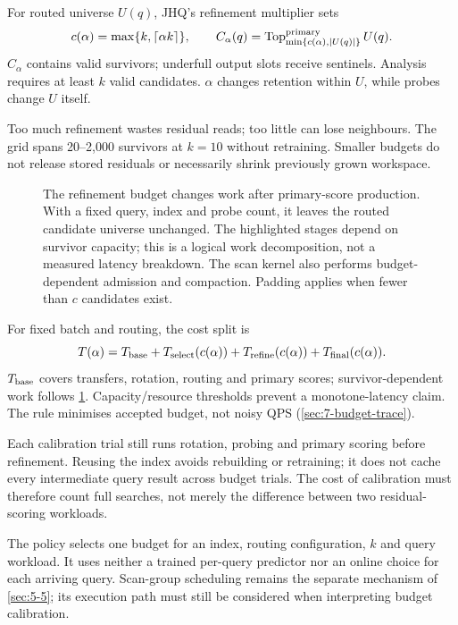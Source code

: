 For routed universe $U(q)$, JHQ's refinement multiplier sets \cite{jhq}
\begin{equation}
 c(\alpha)=\max\{k,\lceil\alpha k\rceil\},\qquad
 C_\alpha(q)=\operatorname{Top}^{\rm primary}_{\min\{c(\alpha),|U(q)|\}}U(q).
 \label{eq:6-budget}
\end{equation}
$C_\alpha$ contains valid survivors; underfull output slots receive sentinels. Analysis requires at least $k$ valid candidates. $\alpha$ changes retention within $U$, while probes change $U$ itself.

Too much refinement wastes residual reads; too little can lose neighbours. The grid spans 20--2,000 survivors at $k=10$ without retraining. Smaller budgets do not release stored residuals or necessarily shrink previously grown workspace.

\begin{figure}[tbp]
\centering

\caption[Work affected by the refinement budget]{The refinement budget changes work after primary-score
production. With a fixed query, index and probe count, it leaves the
routed candidate universe unchanged. The highlighted stages depend on
survivor capacity; this is a logical work decomposition, not a measured
latency breakdown. The scan kernel also performs budget-dependent
admission and compaction. Padding applies when fewer than $c$ candidates exist.}
\label{fig:6-budget-scope}
\end{figure}

For fixed batch and routing, the cost split is
\begin{equation}
 T(\alpha)=T_{\rm base}+T_{\rm select}(c(\alpha))+
 T_{\rm refine}(c(\alpha))+T_{\rm final}(c(\alpha)).
 \label{eq:6-cost-model}
\end{equation}
$T_{\rm base}$ covers transfers, rotation, routing and primary scores; survivor-dependent work follows \cref{fig:6-budget-scope}. Capacity/resource thresholds prevent a monotone-latency claim. The rule minimises accepted budget, not noisy QPS (\cref{sec:7-budget-trace}).


Each calibration trial still runs rotation, probing and primary scoring
before refinement. Reusing the index avoids rebuilding or retraining;
it does not cache every intermediate query result across budget trials.
The cost of calibration must therefore count full searches, not merely
the difference between two residual-scoring workloads.

The policy selects one budget for an index, routing configuration, $k$
and query workload. It uses neither a trained per-query predictor nor
an online choice for each arriving query. Scan-group scheduling remains
the separate mechanism of \cref{sec:5-5}; its execution path must still
be considered when interpreting budget calibration.

